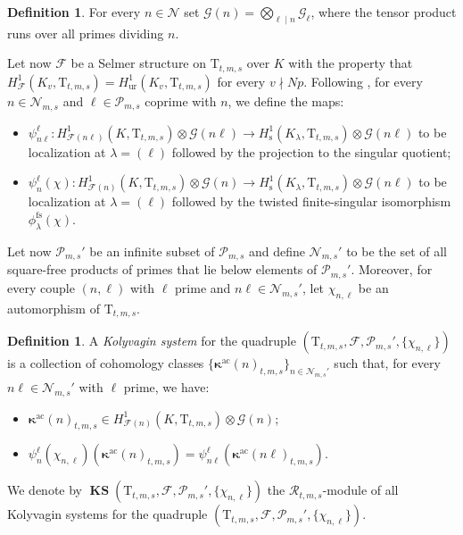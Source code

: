 \documentclass[12pt,reqno]{amsart}
\theoremstyle{definition}
\newtheorem{definition}[theorem]{Definition}
\theoremstyle{remark}
\newcommand{\T}{\boldsymbol{\mathrm{T}}}
\newcommand{\calR}{\mathcal{R}}
\DeclareMathOperator{\ks}{KS}
\newcommand{\KS}{\boldsymbol{\ks}}
\newcommand{\ac}{\mathrm{ac}}
\newcommand{\fs}{\mathrm{fs}}
\newcommand{\s}{\mathrm{s}}
\newcommand{\ur}{\mathrm{ur}}
\newcommand{\gk}{\kappa}
\newcommand{\gl}{\lambda}
\begin{document}
\begin{definition}
    For every $n\in\mathcal{N}$ set $\mathcal{G}(n)=\bigotimes_{\ell\mid n}\mathcal{G}_\ell$, where the tensor product runs over all primes dividing $n$.
\end{definition}
 
Let now $\mathcal{F}$ be a Selmer structure on $\T_{t,m,s}$ over $K$ with the property that $H^1_{\mathcal{F}}(K_v,\T_{t,m,s})=H^1_{\ur}(K_v,\T_{t,m,s})$ for every $v\nmid Np$. Following \cite[§3.1]{Buyukboduk:deformations-of-kolyvagin-systems}, for every $n\in\mathcal{N}_{m,s}$ and $\ell\in\mathcal{P}_{m,s}$ coprime with $n$, we define the maps:
 \begin{itemize}
            \item $\psi_{n\ell}^\ell\colon H^1_{\mathcal{F}(n\ell)}(K,\T_{t,m,s})\otimes\mathcal{G}(n\ell)\to H_{\s}^1(K_{\gl},\T_{t,m,s})\otimes\mathcal{G}(n\ell)$ to be localization at $\gl=(\ell)$ followed by the projection to the singular quotient;
            \item $\psi_n^\ell(\chi)\colon H^1_{\mathcal{F}(n)}(K,\T_{t,m,s})\otimes\mathcal{G}(n)\to H_{\s}^1(K_{\gl},\T_{t,m,s})\otimes\mathcal{G}(n\ell)$ to be localization at $\gl=(\ell)$ followed by the twisted finite-singular isomorphism $\phi_\gl^{\fs}(\chi)$.
\end{itemize}

Let now $\mathcal{P}_{m,s}'$ be an infinite subset of $\mathcal{P}_{m,s}$ and define $\mathcal{N}_{m,s}'$ to be the set of all square-free products of primes that lie below elements of $\mathcal{P}_{m,s}'$. Moreover, for every couple $(n,\ell)$ with $\ell$ prime and $n\ell\in\mathcal{N}_{m,s}'$, let $\chi_{n,\ell}$ be an automorphism of $\T_{t,m,s}$.

\begin{definition}\label{dfn:kolyvagin-system}
        A \emph{Kolyvagin system} for the quadruple $(\T_{t,m,s},\mathcal{F},\mathcal{P}_{m,s}', \{\chi_{n,\ell}\})$ is a collection of cohomology classes $\{\boldsymbol{\gk}^{\ac}(n)_{t,m,s}\}_{n\in\mathcal{N}_{m,s}'}$ such that, for every $n\ell\in\mathcal{N}_{m,s}'$ with $\ell$ prime, we have:
    \begin{itemize}
        \item[(K1)] $\boldsymbol{\gk}^{\ac}(n)_{t,m,s}\in H^1_{\mathcal{F}(n)}(K,\T_{t,m,s})\otimes\mathcal{G}(n)$;
        \item[(K2)] $\psi_n^\ell(\chi_{n,\ell})(\boldsymbol{\gk}^{\ac}(n)_{t,m,s})=\psi_{n\ell}^\ell(\boldsymbol{\gk}^{\ac}(n\ell)_{t,m,s})$.
    \end{itemize}
    We denote by $\KS(\T_{t,m,s},\mathcal{F},\mathcal{P}_{m,s}',\{\chi_{n,\ell}\})$ the $\calR_{t,m,s}$-module of all Kolyvagin systems for the quadruple $(\T_{t,m,s},\mathcal{F},\mathcal{P}_{m,s}',\{\chi_{n,\ell}\})$.
\end{definition}
\end{document}
